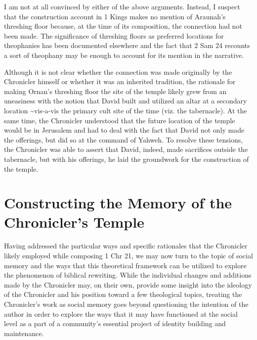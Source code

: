 I am not at all convinced by either of the above arguments. Instead, I
suspect that the construction account in 1 Kings makes no mention of
Araunah's threshing floor because, at the time of its composition, the
connection had not been made. The significance of threshing floors as
preferred locations for theophanies has been documented
elsewhere\autocites[McCarter points to Jdgs 6:37 among other, less
clear, examples from the Hebrew Bible. He also notes their significance
in the Ugaritic literature (KTU 1 17.5.4ff;
19.1.19ff)][511--512]{mccarter1984}[See also][]{waters2015} and the fact
that 2 Sam 24 recounts a sort of theophany may be enough to account for
its mention in the narrative.

Although it is not clear whether the connection was made originally by
the Chronicler himself or whether it was an inherited tradition, the
rationale for making Ornan's threshing floor the site of the temple
likely grew from an uneasiness with the notion that David built and
utilized an altar at a secondary location \textasciitilde{}vis-a-vis the
primary cult site of the time (viz. the tabernacle). At the same time,
the Chronicler understood that the future location of the temple would
be in Jerusalem and had to deal with the fact that David not only made
the offerings, but did so at the command of Yahweh. To resolve these
tensions, the Chronicler was able to assert that David, indeed, made
sacrifices outside the tabernacle, but with his offerings, he laid the
groundwork for the construction of the temple.

\section{Constructing the Memory of the Chronicler's
Temple}\label{constructing-the-memory-of-the-chroniclers-temple}

Having addressed the particular ways and specific rationales that the
Chronicler likely employed while composing 1 Chr 21, we may now turn to
the topic of social memory and the ways that this theoretical framework
can be utilized to explore the phenomenon of biblical rewriting. While
the individual changes and additions made by the Chronicler may, on
their own, provide some insight into the ideology of the Chronicler and
his position toward a few theological topics, treating the Chronicler's
work as social memory goes beyond questioning the intention of the
author in order to explore the ways that it may have functioned at the
social level as a part of a community's essential project of identity
building and maintenance.\autocite[Ben Zvi puts it well: ``Everything is
supposed to be forgotten except that which is supposed to be remembered
by a group. Social, shared remembering within a group involves and
requires a social effort by the relevant group, but without such an
effort and shared memory, the group itself would cease to
exist.''][70]{benzvi_st2017}

